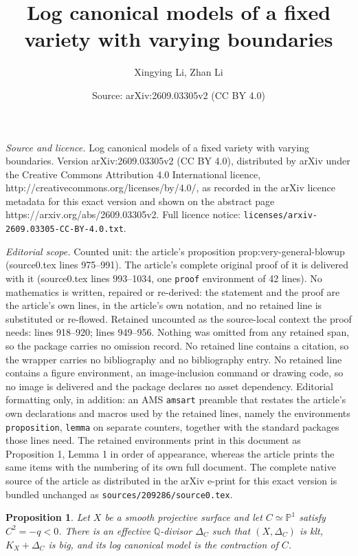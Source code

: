 \documentclass[10pt,a4paper]{amsart}
\title{Log canonical models of a fixed variety with varying boundaries}
\author{Xingying Li, Zhan Li}
\date{Source: arXiv:2609.03305v2 (CC BY 4.0)}
\newtheorem{proposition}{Proposition}
\newcommand{\Pp}{\mathbb{P}}
\newcommand{\Qq}{\mathbb{Q}}
\begin{document}
\maketitle

\noindent\emph{Source and licence.} Log canonical models of a fixed variety with varying boundaries. Version arXiv:2609.03305v2 (CC BY 4.0), distributed by arXiv under the Creative Commons Attribution 4.0 International licence, http://creativecommons.org/licenses/by/4.0/, as recorded in the arXiv licence metadata for this exact version and shown on the abstract page https://arxiv.org/abs/2609.03305v2. Full licence notice: \texttt{licenses/arxiv-2609.03305-CC-BY-4.0.txt}.\par\smallskip

\noindent\textit{Editorial scope.} Counted unit: the article's proposition prop:very-general-blowup (source0.tex lines 975--991). The article's complete original proof of it is delivered with it (source0.tex lines 993--1034, one \texttt{proof} environment of 42 lines). No mathematics is written, repaired or re-derived: the statement and the proof are the article's own lines, in the article's own notation, and no retained line is substituted or re-flowed.  Retained uncounted as the source-local context the proof needs: lines 918--920; lines 949--956.  Nothing was omitted from any retained span, so the package carries no omission record.  No retained line contains a citation, so the wrapper carries no bibliography and no bibliography entry.  No retained line contains a figure environment, an image-inclusion command or drawing code, so no image is delivered and the package declares no asset dependency.  Editorial formatting only, in addition: an AMS \texttt{amsart} preamble that restates the article's own declarations and macros used by the retained lines, namely the environments \texttt{proposition}, \texttt{lemma} on separate counters, together with the standard packages those lines need.  The retained environments print in this document as Proposition 1, Lemma 1 in order of appearance, whereas the article prints the same items with the numbering of its own full document.  The complete native source of the article as distributed in the arXiv e-print for this exact version is bundled unchanged as \texttt{sources/209286/source0.tex}.
\begin{proposition}\label{prop:realize-negative-curve}
Let $X$ be a smooth projective surface and let $C\simeq\Pp^1$ satisfy $C^2=-q<0$. There is an effective $\Qq$-divisor $\Delta_C$ such that $(X,\Delta_C)$ is klt, $K_X+\Delta_C$ is big, and its log canonical model is the contraction of $C$.
\end{proposition}
\end{document}

